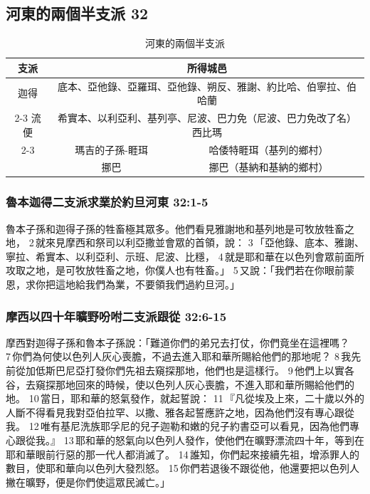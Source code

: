 \subsection{河東的兩個半支派 32}
\noindent
\begin{table}[H]
\centering
\begin{tabular}{|c|c|c|}
\hline
\hline
支派  &\multicolumn{2}{|c|}{所得城邑}        \\ \hline\hline 
迦得& \multicolumn{2}{|c|}{底本、亞他錄、亞羅珥、亞他錄、朔反、雅謝、約比哈、伯寧拉、伯哈蘭}    \\ \cline{2-3}\hline
流便&\multicolumn{2}{|c|}{希實本、以利亞利、基列亭、尼波、巴力免（尼波、巴力免改了名）西比瑪 }\\ \cline{2-3}\hline
\multirow{2}{*}{瑪拿西半支派}  &瑪吉的子孫-睚珥& 哈倭特睚珥（基列的鄉村） \\ 
\multicolumn{1}{|c|}{}  &挪巴&挪巴（基納和基納的鄉村） \\ \hline
\end{tabular}
\caption{河東的兩個半支派 }
\end{table}

\subsubsection{魯本迦得二支派求業於約旦河東 32:1-5}
魯本子孫和迦得子孫的牲畜極其眾多。他們看見雅謝地和基列地是可牧放牲畜之地， 2 就來見摩西和祭司以利亞撒並會眾的首領，說： 3 「亞他錄、底本、雅謝、寧拉、希實本、以利亞利、示班、尼波、比穩， 4 就是耶和華在以色列會眾前面所攻取之地，是可牧放牲畜之地，你僕人也有牲畜。」 5 又說：「我們若在你眼前蒙恩，求你把這地給我們為業，不要領我們過約旦河。」

\subsubsection{摩西以四十年曠野吩咐二支派跟從 32:6-15}
摩西對迦得子孫和魯本子孫說：「難道你們的弟兄去打仗，你們竟坐在這裡嗎？ 7 你們為何使以色列人灰心喪膽，不過去進入耶和華所賜給他們的那地呢？ 8 我先前從加低斯巴尼亞打發你們先祖去窺探那地，他們也是這樣行。 9 他們上以實各谷，去窺探那地回來的時候，使以色列人灰心喪膽，不進入耶和華所賜給他們的地。 10 當日，耶和華的怒氣發作，就起誓說： 11 『凡從埃及上來，二十歲以外的人斷不得看見我對亞伯拉罕、以撒、雅各起誓應許之地，因為他們沒有專心跟從我。 12 唯有基尼洗族耶孚尼的兒子迦勒和嫩的兒子約書亞可以看見，因為他們專心跟從我。』 13 耶和華的怒氣向以色列人發作，使他們在曠野漂流四十年，等到在耶和華眼前行惡的那一代人都消滅了。 14 誰知，你們起來接續先祖，增添罪人的數目，使耶和華向以色列大發烈怒。 15 你們若退後不跟從他，他還要把以色列人撇在曠野，便是你們使這眾民滅亡。」

